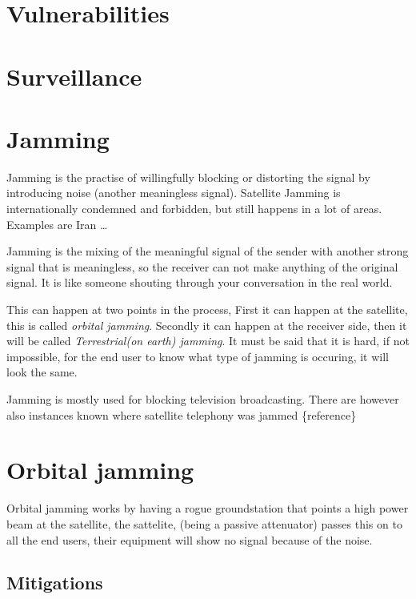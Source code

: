 \section{Vulnerabilities}
\label{vulnerabilities}

\section{Surveillance}
\label{surveillance}

\section{Jamming}
\label{jamming}

Jamming is the practise of willingfully blocking or distorting the signal by introducing noise (another meaningless signal). Satellite Jamming is internationally condemned and forbidden, but still happens in a lot of areas. Examples are Iran {\ldots}

Jamming is the mixing of the meaningful signal of the sender with another strong signal that is meaningless, so the receiver can not make anything of the original signal. It is like someone shouting through your conversation in the real world.

This can happen at two points in the process, First it can happen at the satellite, this is called \emph{orbital jamming}. Secondly it can happen at the receiver side, then it will be called \emph{Terrestrial(on earth) jamming}.
It must be said that it is hard, if not impossible, for the end user to know what type of jamming is occuring, it will look the same.

Jamming is mostly used for blocking television broadcasting. There are however also instances known where satellite telephony was jammed \{reference\}

\section{Orbital jamming}
\label{orbitaljamming}

Orbital jamming works by having a rogue groundstation that points a high power beam at the satellite, the sattelite, (being a passive attenuator) passes this on to all the end users, their equipment will show no signal because of the noise.

\subsection{Mitigations}
\label{mitigations}

